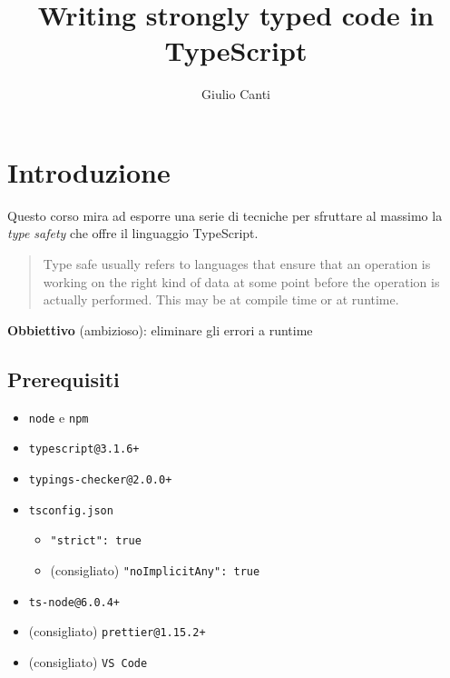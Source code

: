 \documentclass[12pt]{article}
\title{Writing strongly typed code in TypeScript}
\author{Giulio Canti}
\theoremstyle{definition}
\begin{document}
\maketitle

\tableofcontents

\newpage

\section{Introduzione}

Questo corso mira ad esporre una serie di tecniche per sfruttare al massimo la \emph{type safety} che offre il linguaggio TypeScript.

\begin{quote}
Type safe usually refers to languages that ensure that an operation is working on the right kind of data at some point
before the operation is actually performed. This may be at compile time or at runtime.
\end{quote}

\textbf{Obbiettivo} (ambizioso): eliminare gli errori a runtime


\subsection{Prerequisiti}

\begin{itemize}
  \item \texttt{node} e \texttt{npm}
  \item \texttt{typescript@3.1.6+}
  \item \texttt{typings-checker@2.0.0+}
  \item \texttt{tsconfig.json}
    \begin{itemize}
      \item \texttt{"strict": true}
      \item (consigliato) \texttt{"noImplicitAny": true}
    \end{itemize}
  \item \texttt{ts-node@6.0.4+}
  \item (consigliato) \texttt{prettier@1.15.2+}
  \item (consigliato) \texttt{VS Code}
\end{itemize}
\end{document}
